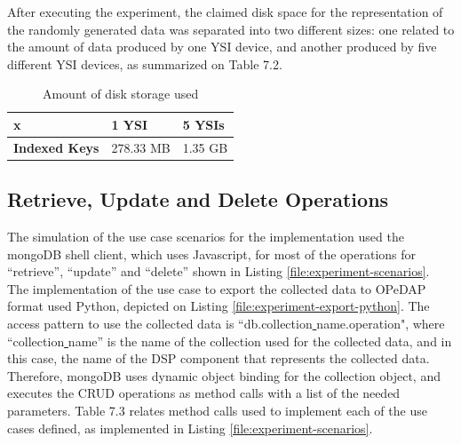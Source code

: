 After executing the experiment, the claimed disk space for the representation
of the randomly generated data was separated into two different sizes: one
related to the amount of data produced by one YSI device, and another produced
by five different YSI devices, as summarized on Table 7.2.

\begin{table}[!h]
    \begin{center}
        \begin{tabular}{|p{100pt}|p{100pt}|p{100pt}|}\hline
        x & \textbf{1 YSI} & \textbf{5 YSIs}\\\hline
        \textbf{Indexed Keys} & 278.33 MB & 1.35 GB \\\hline
        \end{tabular}
        \caption{Amount of disk storage used}
    \end{center}
    \label{tab:experiment-insert-diskspace}
\end{table}

\subsection{Retrieve, Update and Delete Operations}

The simulation of the use case scenarios for the implementation used the mongoDB
shell client, which uses Javascript, for most of the operations for
``retrieve'', ``update'' and ``delete'' shown in Listing
\ref{file:experiment-scenarios}. The implementation of the use case to export
the collected data to OPeDAP format used Python, depicted on Listing
\ref{file:experiment-export-python}. The access pattern to use the collected
data is ``db.collection\underline{ }name.operation", where
``collection\underline{ }name'' is the name of the collection used for the
collected data, and in this case, the name of the DSP component that
represents the collected data. Therefore, mongoDB uses dynamic object binding
for the collection object, and executes the CRUD operations as method calls
with a list of the needed parameters. Table 7.3 relates method calls used to
implement each of the use cases defined, as implemented in Listing
\ref{file:experiment-scenarios}.

